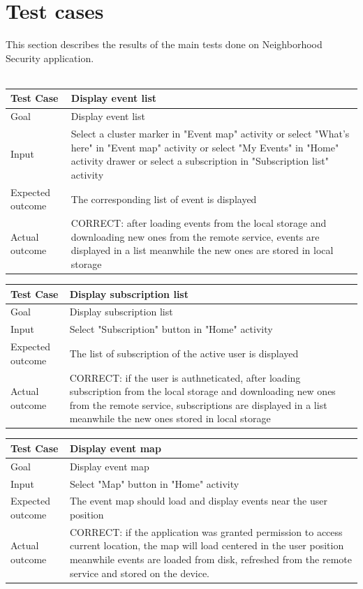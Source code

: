 \documentclass[a4paper]{scrreprt}
\begin{document}
\chapter{Test cases}
This section describes the results of the main tests done on Neighborhood Security application.\\\\
\bigskip
\noindent
\begin{tabularx}{\linewidth}{|l|X|}
	\hline
	\textbf{Test Case} 	& \textbf{Display event list} \\ \hline
	Goal 				& Display event list \\ \hline
	Input 				& Select a cluster marker in  "Event map" activity or select "What's here" in  "Event map" activity or select "My Events" in "Home" activity drawer or select a subscription in "Subscription list" activity \\ \hline
	Expected outcome 	& The corresponding list of event is displayed \\ \hline
	Actual outcome 		& CORRECT: after loading events from the local storage and downloading new ones from the remote service, events are displayed in a list meanwhile the new ones are stored in local storage \\ \hline
\end{tabularx}
\bigskip
\noindent
\begin{tabularx}{\linewidth}{|l|X|}
	\hline
	\textbf{Test Case} 	& \textbf{Display subscription list} \\ \hline
	Goal 				& Display subscription list \\ \hline
	Input 				& Select "Subscription" button in "Home" activity \\ \hline
	Expected outcome 	& The list of subscription of the active user is displayed \\ \hline
	Actual outcome 		& CORRECT: if the user is authneticated, after loading subscription from the local storage and downloading new ones from the remote service, subscriptions are displayed in a list meanwhile the new ones stored in local storage \\ \hline
\end{tabularx}
\bigskip
\noindent
\begin{tabularx}{\linewidth}{|l|X|}
	\hline
	\textbf{Test Case} 	& \textbf{Display event map} \\ \hline
	Goal 				& Display event map \\ \hline
	Input 				& Select "Map" button in "Home" activity \\ \hline
	Expected outcome 	& The event map should load and display events near the user position \\ \hline
	Actual outcome 		& CORRECT: if the application was granted permission to access current location, the map will load centered in the user position meanwhile events are loaded from disk, refreshed from the remote service and stored on the device. \\ \hline
\end{tabularx}
\end{document}
